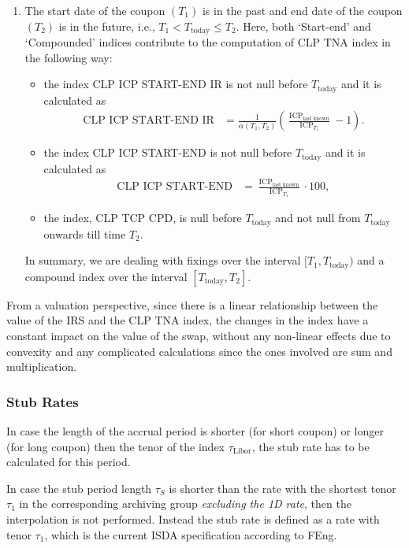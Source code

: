 \documentclass[]{pmv_report} %
\DeclareMathOperator{\ICP}{ICP}
\begin{document}
\begin{enumerate}
  \item The start date of the coupon $(T_1)$ is in the past and end date of the coupon $(T_2)$ is in the future, i.e., $T_1 < T_{\text{today}} \leq T_2$.
    Here, both `Start-end' and `Compounded' indices contribute to the computation of CLP TNA index in the following way:
    \begin{itemize}
      \item the  index CLP ICP START-END IR is not null before $T_{\text{today}}$ and it is calculated as
      \begin{align}
        \text{CLP ICP START-END IR}
          &= \frac{1}{\alpha(T_1,T_2)}\left(\frac{\ICP_{\text{last known}}}{\ICP_{T_1}} - 1\right). \nonumber
      \end{align}
      \item the  index CLP ICP START-END is not null before $T_{\text{today}}$ and it is calculated as
      \begin{align}
      \text{CLP ICP START-END}
        &= \frac{\ICP_{\text{last known}}}{\ICP_{T_1}} \cdot 100, \nonumber
    \end{align}
      \item the  index, CLP TCP CPD, is null before $T_{\text{today}}$ and not null from $T_{\text{today}}$ onwards till time $T_2$.
    \end{itemize}

    In summary, we are dealing with fixings over the interval $[T_1, T_{\text{today}})$ and a compound index over the interval $[T_{\text{today}}, T_2]$.
\end{enumerate}

From a valuation perspective, since there is a linear relationship between the value of the IRS and the CLP TNA index, the changes in the index have a constant impact on the value of the swap, without any non-linear effects due to convexity and any complicated calculations since the ones involved are sum and multiplication.


\subsubsection{Stub Rates}
In case the length of the accrual period is shorter (for short coupon) or longer (for long coupon) then the tenor of the index $\tau_{\text{Libor}}$, the stub rate has to be calculated for this period.

In case the stub period length $\tau_S$ is shorter than the rate with the shortest tenor $\tau_1$ in the corresponding archiving group \textit{excluding the 1D rate}, then the interpolation is not performed.
Instead the stub rate is defined as a rate with tenor $\tau_1$, which is the current ISDA specification according to FEng.
\end{document}
